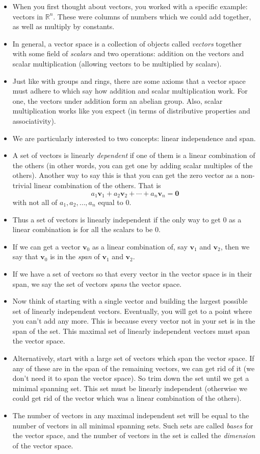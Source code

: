 \documentclass[12pt]{article}
\theoremstyle{plain}
\theoremstyle{definition}
\theoremstyle{remark}
\def\R{\mathbb R}
\def\b{\mathbf}
\def\v{\mathrm{\b v}}
\begin{document}
\begin{itemize}
\item When you first thought about vectors, you worked with a specific example: vectors in $\R^n$.  These were columns of numbers which we could add together, as well as multiply by constants.
\item In general, a vector space is a collection of objects called {\em vectors} together with some field of {\em scalars} and two operations: addition on the vectors and scalar multiplication (allowing vectors to be multiplied by scalars).  
\item Just like with groups and rings, there are some axioms that a vector space must adhere to which say how addition and scalar multiplication work.  For one, the vectors under addition form an abelian group.  Also, scalar multiplication works like you expect (in terms of distributive properties and associativity).
\item We are particularly interested to two concepts: linear independence and span.  
\item A set of vectors is linearly {\em dependent} if one of them is a linear combination of the others (in other words, you can get one by adding scalar multiples of the others).  Another way to say this is that you can get the zero vector as a non-trivial linear combination of the others.  That is
\[a_1\v_1+a_2\v_2 + \cdots +a_n\v_n = \b 0\]
with not all of $a_1, a_2, \ldots, a_n$ equal to 0.
\item Thus a set of vectors is linearly independent if the only way to get 0 as a linear combination is for all the scalars to be 0.
\item If we can get a vector $\v_0$ as a linear combination of, say $\v_1$ and $\v_2$, then we say that $\v_0$ is in the {\em span} of $\v_1$ and $\v_2$.  
\item If we have a set of vectors so that every vector in the vector space is in their span, we say the set of vectors {\em spans} the vector space.
\item Now think of starting with a single vector and building the largest possible set of linearly independent vectors.  Eventually, you will get to a point where you can't add any more.  This is because every vector not in your set is in the span of the set.  This maximal set of linearly independent vectors must span the vector space.
\item Alternatively, start with a large set of vectors which span the vector space.  If any of these are in the span of the remaining vectors, we can get rid of it (we don't need it to span the vector space).  So trim down the set until we get a minimal spanning set.  This set must be linearly independent (otherwise we could get rid of the vector which was a linear combination of the others).
\item The number of vectors in any maximal independent set will be equal to the number of vectors in all minimal spanning sets.  Such sets are called {\em bases} for the vector space, and the number of vectors in the set is called the {\em dimension} of the vector space.
\end{itemize} 
\end{document}
